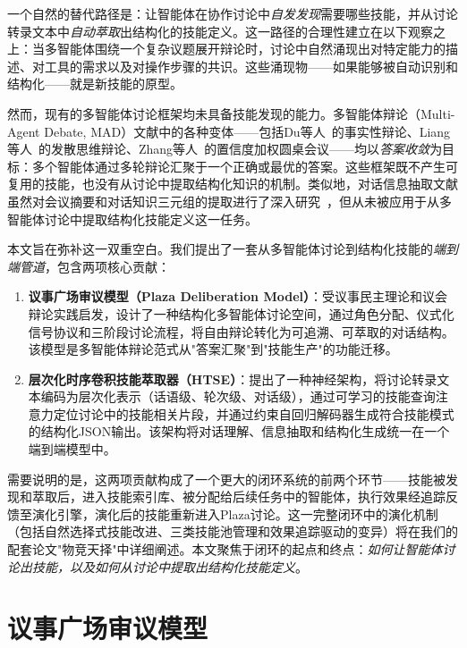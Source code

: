 \documentclass[conference]{IEEEtran}
\begin{document}
一个自然的替代路径是：让智能体在协作讨论中\emph{自发发现}需要哪些技能，并从讨论转录文本中\emph{自动萃取}出结构化的技能定义。这一路径的合理性建立在以下观察之上：当多智能体围绕一个复杂议题展开辩论时，讨论中自然涌现出对特定能力的描述、对工具的需求以及对操作步骤的共识。这些涌现物——如果能够被自动识别和结构化——就是新技能的原型。

然而，现有的多智能体讨论框架均未具备技能发现的能力。多智能体辩论（Multi-Agent Debate, MAD）文献中的各种变体——包括Du等人~\cite{du2023improving}的事实性辩论、Liang等人~\cite{liang2023encouraging}的发散思维辩论、Zhang等人~\cite{zhang2024reconcile}的置信度加权圆桌会议——均以\emph{答案收敛}为目标：多个智能体通过多轮辩论汇聚于一个正确或最优的答案。这些框架既不产生可复用的技能，也没有从讨论中提取结构化知识的机制。类似地，对话信息抽取文献虽然对会议摘要和对话知识三元组的提取进行了深入研究~\cite{yu2022d2k,zhong2021qmsum,ghosal2021dialogue}，但从未被应用于从多智能体讨论中提取结构化技能定义这一任务。

本文旨在弥补这一双重空白。我们提出了一套从多智能体讨论到结构化技能的\emph{端到端管道}，包含两项核心贡献：

\begin{enumerate}[nosep]
\item \textbf{议事广场审议模型（Plaza Deliberation Model）}：受议事民主理论和议会辩论实践启发，设计了一种结构化多智能体讨论空间，通过角色分配、仪式化信号协议和三阶段讨论流程，将自由辩论转化为可追溯、可萃取的对话结构。该模型是多智能体辩论范式从"答案汇聚"到"技能生产"的功能迁移。
\item \textbf{层次化时序卷积技能萃取器（HTSE）}：提出了一种神经架构，将讨论转录文本编码为层次化表示（话语级、轮次级、对话级），通过可学习的技能查询注意力定位讨论中的技能相关片段，并通过约束自回归解码器生成符合技能模式的结构化JSON输出。该架构将对话理解、信息抽取和结构化生成统一在一个端到端模型中。
\end{enumerate}

需要说明的是，这两项贡献构成了一个更大的闭环系统的前两个环节——技能被发现和萃取后，进入技能索引库、被分配给后续任务中的智能体，执行效果经追踪反馈至演化引擎，演化后的技能重新进入Plaza讨论。这一完整闭环中的演化机制（包括自然选择式技能改进、三类技能池管理和效果追踪驱动的变异）将在我们的配套论文"物竞天择"中详细阐述。本文聚焦于闭环的起点和终点：\emph{如何让智能体讨论出技能，以及如何从讨论中提取出结构化技能定义}。

\section{议事广场审议模型}
\end{document}
